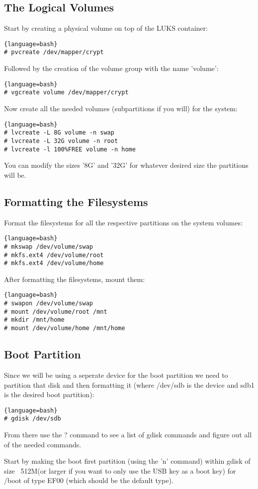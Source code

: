 \subsection{The Logical Volumes}
Start by creating a physical volume on top of the LUKS container:
\begin{lstlisting}{language=bash}
# pvcreate /dev/mapper/crypt
\end{lstlisting}
Followed by the creation of the volume group with the name 'volume':
\begin{lstlisting}{language=bash}
# vgcreate volume /dev/mapper/crypt
\end{lstlisting}
Now create all the needed volumes (subpartitions if you will) for the system:
\begin{lstlisting}{language=bash}
# lvcreate -L 8G volume -n swap
# lvcreate -L 32G volume -n root
# lvcreate -l 100%FREE volume -n home
\end{lstlisting}
You can modify the sizes '8G' and '32G' for whatever desired size the partitions will be.

\subsection{Formatting the Filesystems}
Format the filesystems for all the respective partitions on the system volumes:
\begin{lstlisting}{language=bash}
# mkswap /dev/volume/swap
# mkfs.ext4 /dev/volume/root
# mkfs.ext4 /dev/volume/home
\end{lstlisting}
After formatting the filesystems, mount them:
\begin{lstlisting}{language=bash}
# swapon /dev/volume/swap
# mount /dev/volume/root /mnt
# mkdir /mnt/home
# mount /dev/volume/home /mnt/home
\end{lstlisting}

\subsection{Boot Partition}
Since we will be using a seperate device for the boot partition we need to partition that disk and then formatting it (where /dev/sdb is the device and sdb1 is the desired boot partition):
\begin{lstlisting}{language=bash}
# gdisk /dev/sdb
\end{lstlisting}
From there use the ? command to see a list of gdisk commands and figure out all of the needed commands.

Start by making the boot first partition (using the 'n' command) within gdisk of size ~512M(or larger if you want to only use the USB key as a boot key) for /boot of type EF00 (which should be the default type).

